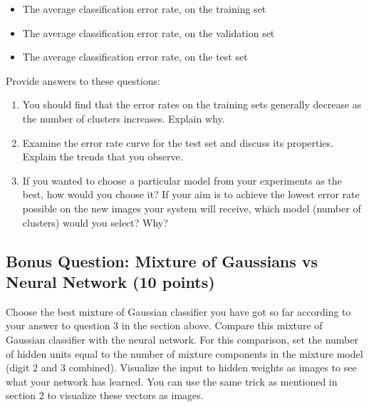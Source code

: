 \documentclass[12pt]{article}
\newcommand{\numbs}{\vspace{-.25in}\begin{enumerate}\setlength{\itemsep}{1mm}}
\begin{document}
\begin{itemize}
\item The average classification error rate, on the training set
\item The average classification error rate, on the validation set
\item The average classification error rate, on the test set
\end{itemize}





Provide answers to these questions:

\vspace{.2in}

\numbs


\item You should find that the error rates on the training sets generally
decrease as the number of clusters increases. Explain why.

\item Examine the error rate curve for the test set and discuss its properties. Explain the trends that you observe.





\item If you wanted to choose a particular
model from your experiments as the best, how would you choose it?
If your aim is to achieve the lowest error
rate possible on the new images your system will receive, which model
(number of clusters) would you select? Why?



\end{enumerate}




\subsection{Bonus Question: Mixture of Gaussians vs Neural Network (10 points)}


Choose the best mixture of Gaussian classifier you have got so far according to
your answer to question 3 in the section above. Compare this mixture of Gaussian
classifier with the neural network. For this comparison, set the number of
hidden units equal to the number of mixture components in the mixture model
(digit 2 and 3 combined). Visualize the input to hidden weights as images to see
what your network has learned. You can use the same trick as mentioned in
section 2 to visualize these vectors as images.
\end{document}
